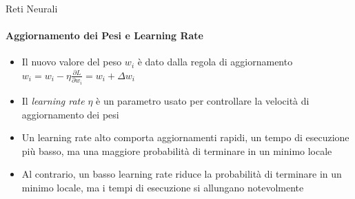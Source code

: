 \documentclass[
 ]{beamer}
\begin{document}
\begin{frame}{Reti Neurali}
    \framesubtitle{Aggiornamento dei Pesi e Learning Rate}
    
    \begin{itemize} [<+->]
        \setlength\itemsep{1.5em}
        \item \large Il nuovo valore del peso $w_i$ è dato dalla regola di aggiornamento  $w_i = w_i - \eta\frac{\partial L}{\partial w_i} = w_i + \Delta w_i$
        \item \large Il \emph{learning rate} $\eta$ è un parametro usato per controllare la velocità di aggiornamento dei pesi 
        \item \large Un learning rate alto comporta aggiornamenti rapidi, un tempo di esecuzione più basso, ma una maggiore probabilità di terminare in un minimo locale
        \item \large Al contrario, un basso learning rate riduce la probabilità di terminare in un minimo locale, ma i tempi di esecuzione si allungano notevolmente
    \end{itemize}      
\end{frame}
\end{document}

